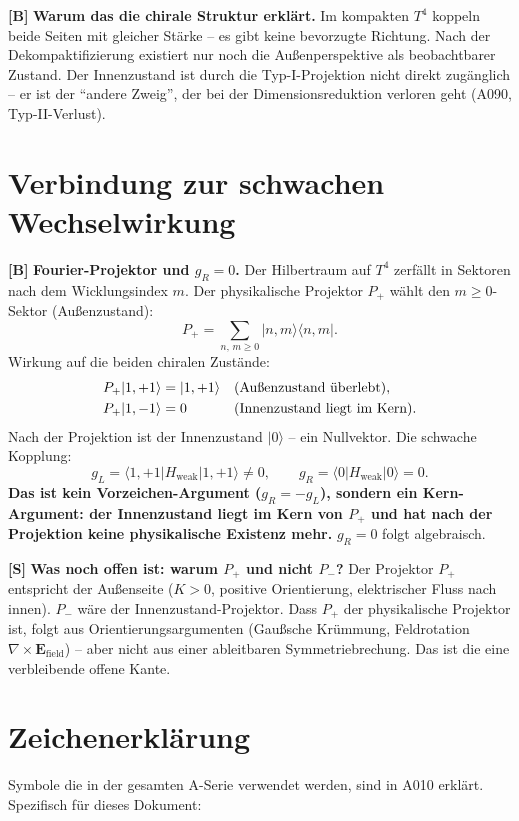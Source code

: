\textbf{[B]} \textbf{Warum das die chirale Struktur erklärt.} Im kompakten
$T^4$ koppeln beide Seiten mit gleicher Stärke -- es gibt keine bevorzugte
Richtung. Nach der Dekompaktifizierung existiert nur noch die Außenperspektive
als beobachtbarer Zustand. Der Innenzustand ist durch die Typ-I-Projektion
nicht direkt zugänglich -- er ist der ``andere Zweig'', der bei der
Dimensionsreduktion verloren geht (A090, Typ-II-Verlust).

\section{Verbindung zur schwachen Wechselwirkung}

\textbf{[B]} \textbf{Fourier-Projektor und $g_R=0$.} Der Hilbertraum auf
$T^4$ zerfällt in Sektoren nach dem Wicklungsindex $m$. Der physikalische
Projektor $P_+$ wählt den $m\ge0$-Sektor (Außenzustand):
\[
  P_+ = \sum_{n,\,m\ge0} |n,m\rangle\langle n,m|.
\]
Wirkung auf die beiden chiralen Zustände:
\begin{align}
  P_+|1,{+}1\rangle &= |1,{+}1\rangle && \text{(Außenzustand überlebt)}, \notag\\
  P_+|1,{-}1\rangle &= 0             && \text{(Innenzustand liegt im Kern)}. \notag
\end{align}
Nach der Projektion ist der Innenzustand $|0\rangle$ -- ein Nullvektor.
Die schwache Kopplung:
\[
  g_L = \langle 1,{+}1|H_\text{weak}|1,{+}1\rangle \neq 0,
  \qquad
  g_R = \langle 0|H_\text{weak}|0\rangle = 0.
\]
\textbf{Das ist kein Vorzeichen-Argument ($g_R=-g_L$), sondern ein
Kern-Argument: der Innenzustand liegt im Kern von $P_+$ und hat nach der
Projektion keine physikalische Existenz mehr.} $g_R=0$ folgt algebraisch.

\textbf{[S]} \textbf{Was noch offen ist: warum $P_+$ und nicht $P_-$?}
Der Projektor $P_+$ entspricht der Außenseite ($K>0$, positive Orientierung,
elektrischer Fluss nach innen). $P_-$ wäre der Innenzustand-Projektor.
Dass $P_+$ der physikalische Projektor ist, folgt aus Orientierungsargumenten
(Gaußsche Krümmung, Feldrotation $\nabla\times\mathbf{E}_\text{field}$) --
aber nicht aus einer ableitbaren Symmetriebrechung. Das ist die eine
verbleibende offene Kante.

\section{Zeichenerklärung}

Symbole die in der gesamten A-Serie verwendet werden, sind in A010 erklärt.
Spezifisch für dieses Dokument:

